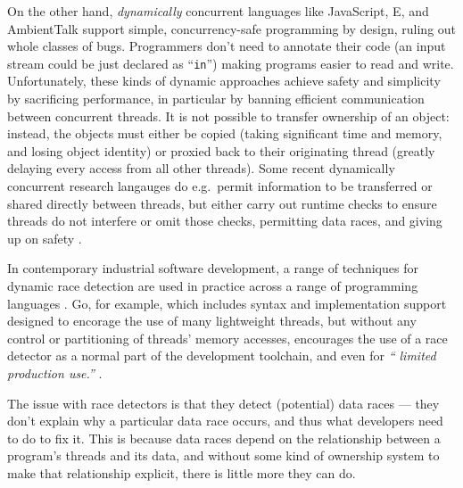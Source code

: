 On the other hand,
\textit{dynamically} concurrent languages like
JavaScript\cite{JSVAts},
E\cite{MillerPhD}, and
AmbientTalk\cite{AmbientTalk} support simple,
concurrency-safe programming by design, ruling out whole classes of
bugs.
Programmers don't need to annotate their code
(an input stream could be just declared as ``\verb+in+'')
making programs easier to read and write.
Unfortunately, these kinds of dynamic approaches achieve safety and simplicity
by sacrificing performance, in particular by banning efficient
communication between concurrent threads.
It is not possible to transfer ownership of an object:
instead, the objects must either be copied
\cite{destructive-read}
%
(taking significant time and memory, and losing object identity)
or proxied back to their originating thread
\cite{CASTEGREN2018130,JSproxies,AmbientTalk}
(greatly delaying every access from all other threads).
Some recent dynamically concurrent research langauges do e.g.\ permit
information to be transferred or shared directly between threads,
but either carry out runtime checks to ensure threads do not interfere
\cite{Daloze2016,Daloze2018}
or omit those checks, permitting data races, and giving up on safety
\cite{GoConcurBugs2019,raffi2020}.




In contemporary industrial software development, a range of techniques
for dynamic race detection are used in practice across a range of
programming languages
\cite{hong2015survey,o2003hybrid,cai2021sound,TSanRV2011,DBLP:conf/rv/EricksonFM12}.  Go, for
example, which includes syntax and implementation support designed to
encorage the use of many lightweight threads, but without any control
or partitioning of threads' memory accesses,  encourages the use
of a race detector as a normal part of the development toolchain, and
even for \textit{`` limited production use.''}
\cite{GoCACM2022,TSanRV2011}.

The issue with race detectors is that they detect (potential)
data races --- they don't explain why a particular data race
occurs, and thus what developers need to do to fix it.  This is
because data races depend on the relationship between a program's threads and
its data, and without some kind of ownership system to make that
relationship explicit, there is little more they can do.


